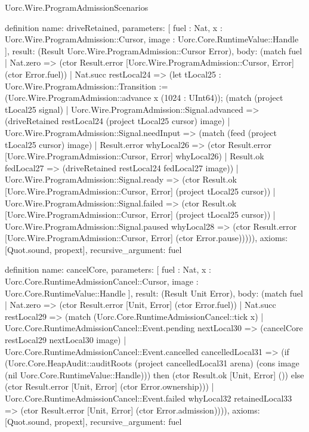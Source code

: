 \begin{lexlean}{Uorc.Wire.ProgramAdmissionScenarios}
\begin{semanticmodule}
definition{
  name: driveRetained,
  parameters: [
    fuel : Nat,
    x : Uorc.Wire.ProgramAdmission::Cursor,
    image : Uorc.Core.RuntimeValue::Handle
  ],
  result: (Result Uorc.Wire.ProgramAdmission::Cursor Error),
  body: (match fuel
    | Nat.zero => (ctor Result.error [Uorc.Wire.ProgramAdmission::Cursor, Error] (ctor Error.fuel))
    | Nat.succ restLocal24 => (let tLocal25 : Uorc.Wire.ProgramAdmission::Transition := (Uorc.Wire.ProgramAdmission::advance x (1024 : UInt64)); (match (project tLocal25 signal)
      | Uorc.Wire.ProgramAdmission::Signal.advanced => (driveRetained restLocal24 (project tLocal25 cursor) image)
      | Uorc.Wire.ProgramAdmission::Signal.needInput => (match (feed (project tLocal25 cursor) image)
        | Result.error whyLocal26 => (ctor Result.error [Uorc.Wire.ProgramAdmission::Cursor, Error] whyLocal26)
        | Result.ok fedLocal27 => (driveRetained restLocal24 fedLocal27 image))
      | Uorc.Wire.ProgramAdmission::Signal.ready => (ctor Result.ok [Uorc.Wire.ProgramAdmission::Cursor, Error] (project tLocal25 cursor))
      | Uorc.Wire.ProgramAdmission::Signal.failed => (ctor Result.ok [Uorc.Wire.ProgramAdmission::Cursor, Error] (project tLocal25 cursor))
      | Uorc.Wire.ProgramAdmission::Signal.paused whyLocal28 => (ctor Result.error [Uorc.Wire.ProgramAdmission::Cursor, Error] (ctor Error.pause))))),
  axioms: [Quot.sound, propext],
  recursive_argument: fuel
}

definition{
  name: cancelCore,
  parameters: [
    fuel : Nat,
    x : Uorc.Core.RuntimeAdmissionCancel::Cursor,
    image : Uorc.Core.RuntimeValue::Handle
  ],
  result: (Result Unit Error),
  body: (match fuel
    | Nat.zero => (ctor Result.error [Unit, Error] (ctor Error.fuel))
    | Nat.succ restLocal29 => (match (Uorc.Core.RuntimeAdmissionCancel::tick x)
      | Uorc.Core.RuntimeAdmissionCancel::Event.pending nextLocal30 => (cancelCore restLocal29 nextLocal30 image)
      | Uorc.Core.RuntimeAdmissionCancel::Event.cancelled cancelledLocal31 => (if (Uorc.Core.HeapAudit::auditRoots (project cancelledLocal31 arena) (cons image (nil Uorc.Core.RuntimeValue::Handle))) then (ctor Result.ok [Unit, Error] ()) else (ctor Result.error [Unit, Error] (ctor Error.ownership)))
      | Uorc.Core.RuntimeAdmissionCancel::Event.failed whyLocal32 retainedLocal33 => (ctor Result.error [Unit, Error] (ctor Error.admission)))),
  axioms: [Quot.sound, propext],
  recursive_argument: fuel
}


\end{semanticmodule}
\end{lexlean}
